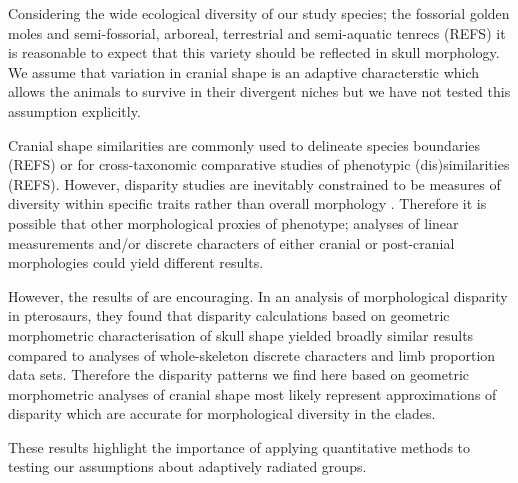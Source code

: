 \documentclass[12pt,a4paper]{article}
\begin{document}
	Considering the wide ecological diversity of our study species; the fossorial golden moles and semi-fossorial, arboreal, terrestrial and semi-aquatic tenrecs (REFS) it is reasonable to expect that this variety should be reflected in skull morphology.
	We assume that variation in cranial shape is an adaptive characterstic which allows the animals to survive in their divergent niches but we have not tested this assumption explicitly. 


	Cranial shape similarities are commonly used to delineate species boundaries (REFS) or for cross-taxonomic comparative studies of phenotypic (dis)similarities (REFS). However, disparity studies are inevitably constrained to be measures of diversity within specific traits rather than overall morphology \citep{Roy1997}. Therefore it is possible that other morphological proxies of phenotype; analyses of linear measurements and/or discrete characters of either cranial or post-cranial morphologies could yield different results. 

	However, the results of \citep{Foth2012} are encouraging. In an analysis of morphological disparity in pterosaurs, they found that disparity calculations based on geometric morphometric characterisation of skull shape yielded broadly similar results compared to analyses of whole-skeleton discrete characters and limb proportion data sets. Therefore the disparity patterns we find here based on geometric morphometric analyses of cranial shape most likely represent approximations of disparity which are accurate for morphological diversity in the clades. 






	These results highlight the importance of applying quantitative methods to testing our assumptions about adaptively radiated groups. 
\end{document}
